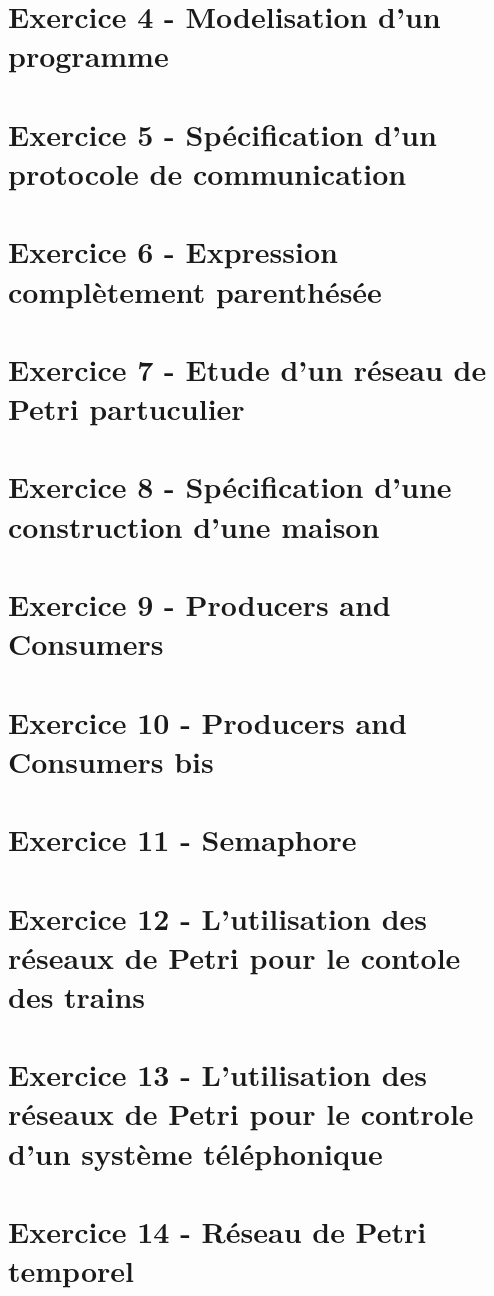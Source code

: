 \documentclass[]{article}
\begin{document}
\section{Exercice 4 - Modelisation d'un programme}

\section{Exercice 5 - Spécification d'un protocole de communication}

\section{Exercice 6 - Expression complètement parenthésée}

\section{Exercice 7 - Etude d'un réseau de Petri partuculier}

\section{Exercice 8 - Spécification d'une construction d'une maison}

\section{Exercice 9 - Producers and Consumers}

\section{Exercice 10 - Producers and Consumers bis}

\section{Exercice 11 - Semaphore}

\section{Exercice 12 - L'utilisation des réseaux de Petri pour le contole des trains}

\section{Exercice 13 - L'utilisation des réseaux de Petri pour le controle d'un système téléphonique}

\section{Exercice 14 - Réseau de Petri temporel}

\end{document}
